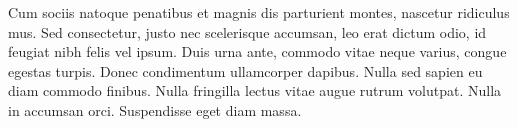 Cum sociis natoque penatibus et magnis dis parturient montes, nascetur ridiculus mus. Sed consectetur, justo nec scelerisque accumsan, leo erat dictum odio, id feugiat nibh felis vel ipsum. Duis urna ante, commodo vitae neque varius, congue egestas turpis. Donec condimentum ullamcorper dapibus. Nulla sed sapien eu diam commodo finibus. Nulla fringilla lectus vitae augue rutrum volutpat. Nulla in accumsan orci. Suspendisse eget diam massa.